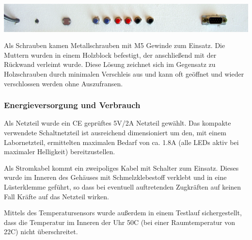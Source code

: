 \vspace{2em}
\centerline{\includegraphics[width=\linewidth]{images/anschluesse.png}} 
\label{fig_anschluesse}
\vspace{.5em}

Als Schrauben kamen Metallschrauben mit M5 %
Gewinde zum Einsatz. Die Muttern wurden in einem Holzblock befestigt, der anschließend mit der Rückwand verleimt wurde.%
Diese Lösung zeichnet sich im Gegensatz zu Holzschrauben durch minimalen Verschleis aus und kann oft geöffnet und wieder verschlossen werden ohne Auszufransen.

\subsubsection{Energieversorgung und Verbrauch}
Als Netzteil wurde ein CE geprüftes 5V/2A Netzteil gewählt. Das kompakte verwendete Schaltnetzteil ist ausreichend dimensioniert um den, mit einem Labornetzteil, ermittelten maximalen Bedarf von ca. 1.8A (alle LEDs aktiv bei maximaler Helligkeit) bereitzustellen.
 
Als Stromkabel kommt ein zweipoliges Kabel mit Schalter zum Einsatz. Dieses wurde im Inneren des Gehäuses mit Schmelzklebestoff verklebt und in eine Lüsterklemme geführt, so dass bei eventuell auftretenden Zugkräften auf keinen Fall Kräfte auf das Netzteil wirken.

Mittels des Temperatursensors wurde außerdem in einem Testlauf sichergestellt, dass die Temperatur im Inneren der Uhr 50\degree C (bei einer Raumtemperatur von 22\degree C) nicht überschreitet.
